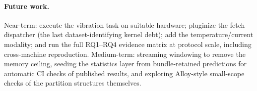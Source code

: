 \paragraph{Future work.}
Near-term: execute the vibration task on suitable hardware; pluginize the
fetch dispatcher (the last dataset-identifying kernel debt); add the
temperature/current modality; and run the full RQ1--RQ4 evidence matrix at
protocol scale, including cross-machine reproduction. Medium-term: streaming
windowing to remove the memory ceiling, seeding the statistics layer from
bundle-retained predictions for automatic CI checks of published results,
and exploring Alloy-style small-scope checks of the partition structures
themselves.
